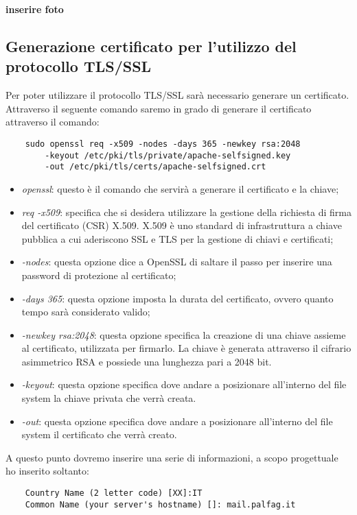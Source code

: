 \textbf{inserire foto}

\subsection{Generazione certificato per l'utilizzo del protocollo TLS/SSL}
Per poter utilizzare il protocollo TLS/SSL sarà necessario generare un certificato.
Attraverso il seguente comando saremo in grado di generare il certificato attraverso il comando:

\begin{verbatim}
    sudo openssl req -x509 -nodes -days 365 -newkey rsa:2048 
        -keyout /etc/pki/tls/private/apache-selfsigned.key 
        -out /etc/pki/tls/certs/apache-selfsigned.crt
\end{verbatim}

\begin{itemize}
    \item \textit{openssl}: questo è il comando che servirà a generare il certificato e la chiave;
    \item \textit{req -x509}: specifica che si desidera utilizzare la gestione della richiesta di firma del certificato 
    (CSR) X.509. X.509 è uno standard di infrastruttura a chiave pubblica a cui aderiscono SSL e TLS per la gestione 
    di chiavi e certificati;
    \item \textit{-nodes}: questa opzione dice a OpenSSL di saltare il passo per inserire una password di protezione al certificato;
    \item \textit{-days 365}: questa opzione imposta la durata del certificato, ovvero quanto tempo sarà considerato
    valido;
    \item \textit{-newkey rsa:2048}: questa opzione specifica la creazione di una chiave assieme al certificato, 
    utilizzata per firmarlo. La chiave è generata attraverso il cifrario asimmetrico RSA 
    e possiede una lunghezza pari a 2048 bit.
    \item \textit{-keyout}: questa opzione specifica dove andare a posizionare all’interno del 
    file system la chiave privata che verrà creata.
    \item \textit{-out}: questa opzione specifica dove andare a posizionare all’interno del file system il certificato che verrà creato.
\end{itemize}

A questo punto dovremo inserire una serie di informazioni, a scopo progettuale ho inserito soltanto:

\begin{verbatim}
    Country Name (2 letter code) [XX]:IT
    Common Name (your server's hostname) []: mail.palfag.it
\end{verbatim}

